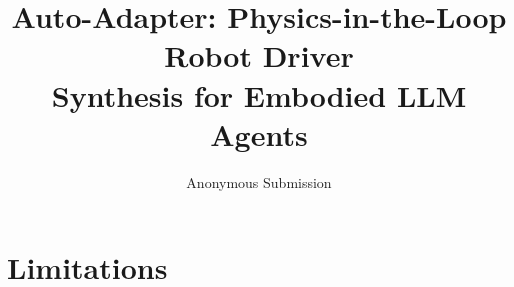 \documentclass[11pt]{article}
\title{Auto-Adapter: Physics-in-the-Loop Robot Driver\\
       Synthesis for Embodied LLM Agents}
\author{Anonymous Submission}
\begin{document}
\maketitle










\section*{Limitations}




\clearpage
\appendix













\end{document}
